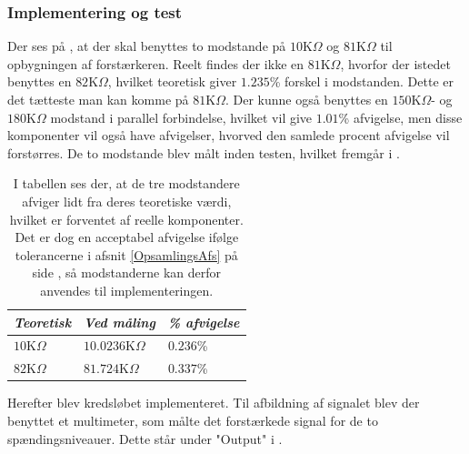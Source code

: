 \subsubsection{Implementering og test}
Der ses på , at der skal benyttes to modstande på $10$K$\Omega$ og $81$K$\Omega$ til opbygningen af forstærkeren. Reelt findes der ikke en $81$K$\Omega$, hvorfor der istedet benyttes en $82$K$\Omega$, hvilket teoretisk giver $1.235$\% forskel i modstanden. Dette er det tætteste man kan komme på $81$K$\Omega$. Der kunne også benyttes en $150$K$\Omega$- og $180$K$\Omega$ modstand i parallel forbindelse, hvilket vil give $1.01$\% afvigelse, men disse komponenter vil også have afvigelser, hvorved den samlede procent afvigelse vil forstørres. De to modstande blev målt inden testen, hvilket fremgår i .
\begin{table}[H]
	\centering
	\begin{tabular}{|l|l|l|}
		\hline
		\textit{Teoretisk} & \textit{Ved måling} & \textit{\% afvigelse} \\ \hline
		$10$K$\Omega$      & $10.0236$K$\Omega$    & $0.236$\%           \\ \hline
		$82$K$\Omega$      & $81.724$K$\Omega$     & $0.337$\%           \\ \hline
	\end{tabular}
	\caption{I tabellen ses der, at de tre modstandere afviger lidt fra deres teoretiske værdi, hvilket er forventet af reelle komponenter. Det er dog en acceptabel afvigelse ifølge tolerancerne i afsnit \ref{OpsamlingsAfs} på side \pageref{OpsamlingsAfs}, så modstanderne kan derfor anvendes til implementeringen.}
	\label{Tab:modstand_faktor18}
\end{table}
\noindent Herefter blev kredsløbet implementeret. Til afbildning af signalet blev der benyttet et multimeter, som målte det forstærkede signal for de to spændingsniveauer. Dette står under "Output" i .\
